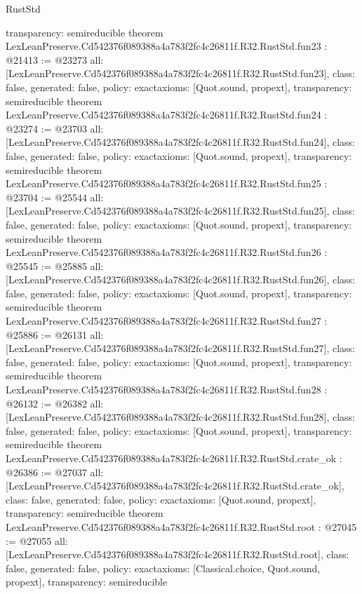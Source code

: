 \begin{lexlean}{RustStd}
\begin{coremodule}
{  transparency: semireducible
}
theorem LexLeanPreserve.Cd542376f089388a4a783f2fc4c26811f.R32.RustStd.fun23 : @21413 := @23273 {
  all: [LexLeanPreserve.Cd542376f089388a4a783f2fc4c26811f.R32.RustStd.fun23],
  class: false,
  generated: false,
  policy: exact{axioms: [Quot.sound, propext]},
  transparency: semireducible
}
theorem LexLeanPreserve.Cd542376f089388a4a783f2fc4c26811f.R32.RustStd.fun24 : @23274 := @23703 {
  all: [LexLeanPreserve.Cd542376f089388a4a783f2fc4c26811f.R32.RustStd.fun24],
  class: false,
  generated: false,
  policy: exact{axioms: [Quot.sound, propext]},
  transparency: semireducible
}
theorem LexLeanPreserve.Cd542376f089388a4a783f2fc4c26811f.R32.RustStd.fun25 : @23704 := @25544 {
  all: [LexLeanPreserve.Cd542376f089388a4a783f2fc4c26811f.R32.RustStd.fun25],
  class: false,
  generated: false,
  policy: exact{axioms: [Quot.sound, propext]},
  transparency: semireducible
}
theorem LexLeanPreserve.Cd542376f089388a4a783f2fc4c26811f.R32.RustStd.fun26 : @25545 := @25885 {
  all: [LexLeanPreserve.Cd542376f089388a4a783f2fc4c26811f.R32.RustStd.fun26],
  class: false,
  generated: false,
  policy: exact{axioms: [Quot.sound, propext]},
  transparency: semireducible
}
theorem LexLeanPreserve.Cd542376f089388a4a783f2fc4c26811f.R32.RustStd.fun27 : @25886 := @26131 {
  all: [LexLeanPreserve.Cd542376f089388a4a783f2fc4c26811f.R32.RustStd.fun27],
  class: false,
  generated: false,
  policy: exact{axioms: [Quot.sound, propext]},
  transparency: semireducible
}
theorem LexLeanPreserve.Cd542376f089388a4a783f2fc4c26811f.R32.RustStd.fun28 : @26132 := @26382 {
  all: [LexLeanPreserve.Cd542376f089388a4a783f2fc4c26811f.R32.RustStd.fun28],
  class: false,
  generated: false,
  policy: exact{axioms: [Quot.sound, propext]},
  transparency: semireducible
}
theorem LexLeanPreserve.Cd542376f089388a4a783f2fc4c26811f.R32.RustStd.crate_ok : @26386 := @27037 {
  all: [LexLeanPreserve.Cd542376f089388a4a783f2fc4c26811f.R32.RustStd.crate_ok],
  class: false,
  generated: false,
  policy: exact{axioms: [Quot.sound, propext]},
  transparency: semireducible
}
theorem LexLeanPreserve.Cd542376f089388a4a783f2fc4c26811f.R32.RustStd.root : @27045 := @27055 {
  all: [LexLeanPreserve.Cd542376f089388a4a783f2fc4c26811f.R32.RustStd.root],
  class: false,
  generated: false,
  policy: exact{axioms: [Classical.choice, Quot.sound, propext]},
  transparency: semireducible
}


\end{coremodule}
\end{lexlean}

